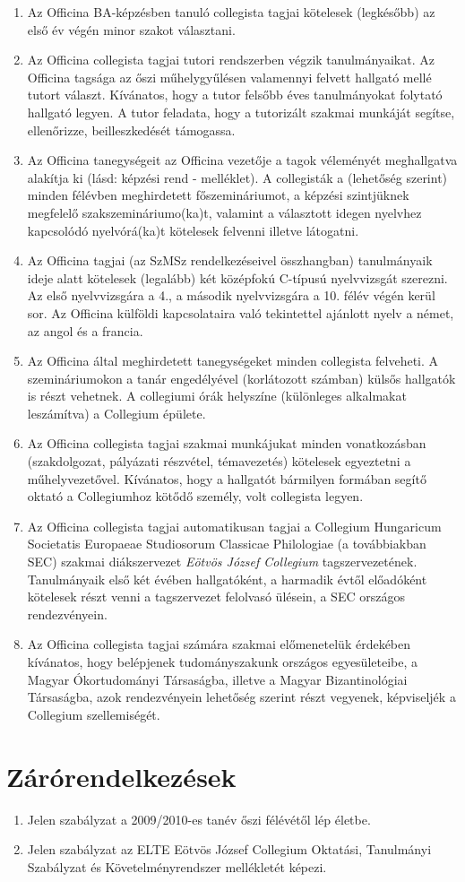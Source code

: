\documentclass{rulebook}
\begin{document}
\begin{enumerate}
	\item Az Officina BA-képzésben tanuló collegista tagjai kötelesek (legkésőbb) az első év végén minor szakot választani.
	\item Az Officina collegista tagjai tutori rendszerben végzik tanulmányaikat. Az Officina tagsága az őszi műhelygyűlésen valamennyi felvett hallgató mellé tutort választ. Kívánatos, hogy a tutor felsőbb éves tanulmányokat folytató hallgató legyen. A tutor feladata, hogy a tutorizált szakmai munkáját segítse, ellenőrizze, beilleszkedését támogassa.
	\item Az Officina tanegységeit az Officina vezetője a tagok véleményét meghallgatva alakítja ki (lásd: képzési rend - melléklet). A collegisták a (lehetőség szerint) minden félévben meghirdetett főszemináriumot, a képzési szintjüknek megfelelő szakszemináriumo(ka)t, valamint a választott idegen nyelvhez kapcsolódó nyelvórá(ka)t kötelesek felvenni illetve látogatni.
	\item Az Officina tagjai (az SzMSz rendelkezéseivel összhangban) tanulmányaik ideje alatt kötelesek (legalább) két középfokú C-típusú nyelvvizsgát szerezni. Az első nyelvvizsgára a 4., a második nyelvvizsgára a 10. félév végén kerül sor. Az Officina külföldi kapcsolataira való tekintettel ajánlott nyelv a német, az angol és a francia.
	\item Az Officina által meghirdetett tanegységeket minden collegista felveheti. A szemináriumokon a tanár engedélyével (korlátozott számban) külsős hallgatók is részt vehetnek. A collegiumi órák helyszíne (különleges alkalmakat leszámítva) a Collegium épülete.
	\item Az Officina collegista tagjai szakmai munkájukat minden vonatkozásban (szakdolgozat, pályázati részvétel, témavezetés) kötelesek egyeztetni a műhelyvezetővel. Kívánatos, hogy a hallgatót bármilyen formában segítő oktató a Collegiumhoz kötődő személy, volt collegista legyen.
	\item Az Officina collegista tagjai automatikusan tagjai a Collegium Hungaricum Societatis Europaeae Studiosorum Classicae Philologiae (a továbbiakban SEC) szakmai diákszervezet \emph{Eötvös József Collegium} tagszervezetének. Tanulmányaik első két évében hallgatóként, a harmadik évtől előadóként kötelesek részt venni a tagszervezet felolvasó ülésein, a SEC országos rendezvényein.
	\item Az Officina collegista tagjai számára szakmai előmenetelük érdekében kívánatos, hogy belépjenek tudományszakunk országos egyesületeibe, a Magyar Ókortudományi Társaságba, illetve a Magyar Bizantinológiai Társaságba, azok rendezvényein lehetőség szerint részt vegyenek, képviseljék a Collegium szellemiségét.
\end{enumerate}

\section{Zárórendelkezések}

\begin{enumerate}
	\item Jelen szabályzat a 2009/2010-es tanév őszi félévétől lép életbe.
	\item Jelen szabályzat az ELTE Eötvös József Collegium Oktatási, Tanulmányi Szabályzat és Követelményrendszer mellékletét képezi.
\end{enumerate}
\end{document}
